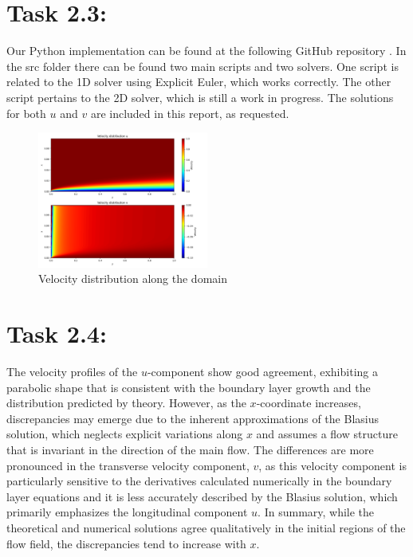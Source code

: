 \documentclass{article}
\begin{document}
\section*{\Large Task 2.3:}
Our Python implementation can be found at the following GitHub repository \cite{GitHubRepo}. In the src folder there can be found two main scripts and two solvers.
One script is related to the 1D solver using Explicit Euler, which works correctly. The other script pertains to the 2D solver, which is still a work in progress. 
The solutions for both \( u \) and \( v \) are included in this report, as requested.
\begin{figure}[h!]
  \centering
  \includegraphics[width=0.5\textwidth]{velocity_distribution.png}
  \caption{Velocity distribution along the domain}
  \label{fig:velocity_distribution}
\end{figure}

\section*{\Large Task 2.4:}
The velocity profiles of the \( u \)-component show good agreement, exhibiting a parabolic shape that is consistent with the boundary layer 
growth and the distribution predicted by theory. However, as the \( x \)-coordinate increases, discrepancies may emerge due to the inherent 
approximations of the Blasius solution, which neglects explicit variations along \( x \) and assumes a flow structure that is invariant in the 
direction of the main flow. The differences are more pronounced in the transverse velocity component, \( v \), as this velocity component is
particularly sensitive to the derivatives calculated numerically in the boundary layer equations and it is less accurately described by the
Blasius solution, which primarily emphasizes the longitudinal component \( u \). In summary, while the theoretical and numerical solutions 
agree qualitatively in the initial regions of the flow field, the discrepancies tend to increase with \( x \).
\end{document}
